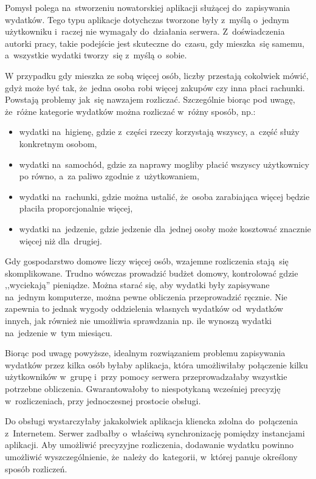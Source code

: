 \documentclass[12pt,a4paper,twoside,titlepage,openright]{book}
\begin{document}
Pomysł polega na~stworzeniu nowatorskiej aplikacji służącej do~zapisywania wydatków. Tego typu aplikacje dotychczas tworzone były z~myślą o~jednym użytkowniku i~raczej nie wymagały do~działania serwera. Z~doświadczenia autorki pracy, takie podejście jest skuteczne do~czasu, gdy mieszka~się samemu, a~wszystkie wydatki tworzy~się z~myślą o~sobie. 

W przypadku gdy mieszka ze sobą więcej osób, liczby przestają cokolwiek mówić, gdyż może być tak, że~jedna osoba robi więcej zakupów czy inna płaci rachunki. Powstają problemy jak~się nawzajem rozliczać. Szczególnie biorąc pod uwagę, że~różne kategorie wydatków można rozliczać w~różny sposób, np.:
\begin{itemize}
\item wydatki na~higienę, gdzie z~części rzeczy korzystają wszyscy, a~część służy konkretnym osobom,
\item wydatki na~samochód, gdzie za naprawy mogliby płacić wszyscy użytkownicy po równo, a~za paliwo zgodnie z~użytkowaniem,
\item wydatki na~rachunki, gdzie można ustalić, że~osoba zarabiająca więcej będzie płaciła proporcjonalnie więcej,
\item wydatki na~jedzenie, gdzie jedzenie dla~jednej osoby może kosztować znacznie więcej niż dla~drugiej.
\end{itemize}
Gdy gospodarstwo domowe liczy więcej osób, wzajemne rozliczenia stają~się skomplikowane. Trudno wówczas prowadzić budżet domowy, kontrolować gdzie ,,wyciekają'' pieniądze. Można starać się, aby wydatki były zapisywane na~jednym komputerze, można pewne obliczenia przeprowadzić ręcznie. Nie zapewnia to jednak wygody oddzielenia własnych wydatków od~wydatków innych, jak również nie umożliwia sprawdzania np. ile wynoszą wydatki na~jedzenie w~tym miesiącu.

Biorąc pod uwagę powyższe, idealnym rozwiązaniem problemu zapisywania wydatków przez kilka osób byłaby aplikacja, która umożliwiłaby połączenie kilku użytkowników w~grupę i~przy pomocy serwera przeprowadzałaby wszystkie potrzebne obliczenia. Gwarantowałoby to niespotykaną wcześniej precyzję w~rozliczeniach, przy jednoczesnej prostocie obsługi. 

Do obsługi wystarczyłaby jakakolwiek aplikacja kliencka zdolna do~połączenia z~Internetem. Serwer zadbałby o~właściwą synchronizację pomiędzy instancjami aplikacji. Aby umożliwić precyzyjne rozliczenia, dodawanie wydatku powinno umożliwić wyszczególnienie, że~należy do~kategorii, w~której panuje określony sposób rozliczeń. 
\end{document}
